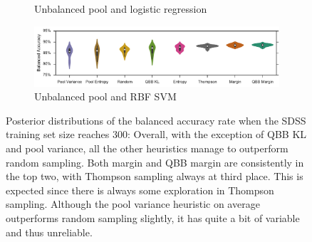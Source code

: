 \begin{figure}[p]
\begin{subfigure}{\textwidth}
		\caption{Unbalanced pool and logistic regression}
		\label{fig:sdss_ul_ind_violin}
	\end{subfigure}
	\begin{subfigure}{\textwidth}
		\centering
		\includegraphics[width=\linewidth]{figures/5_active/sdss_ur_ind_violin}
		\caption{Unbalanced pool and RBF SVM}
		\label{fig:sdss_ur_ind_violin}
	\end{subfigure}
	\caption[Violin plots of balanced accuracy rate (SDSS)]{
		Posterior distributions of the balanced accuracy rate when the SDSS training set size reaches 300: Overall, with the exception of QBB KL and pool variance, all the other
		heuristics manage to outperform random sampling. Both margin and QBB margin are consistently in the top two, with Thompson sampling always at third place. This is expected
		since there is always some exploration in Thompson sampling. Although the pool
		variance heuristic on average outperforms random sampling slightly, it has quite a
		bit of variable and thus unreliable.}
	\label{fig:sdss_bl_ind}
\end{figure}


